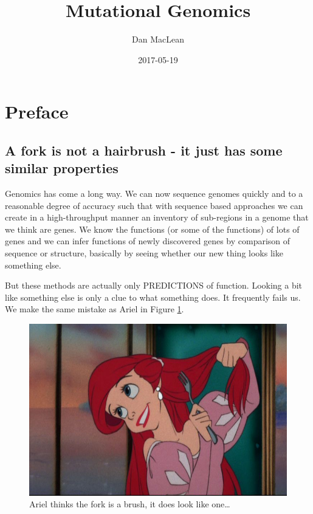 \documentclass[12pt,]{book}
\title{Mutational Genomics}
\author{Dan MacLean}
\date{2017-05-19}
\begin{document}
\maketitle

{
\setcounter{tocdepth}{1}
\tableofcontents
}
\listoffigures
\chapter*{Preface}\label{preface}

\section*{A fork is not a hairbrush - it just has some similar
properties}\label{a-fork-is-not-a-hairbrush---it-just-has-some-similar-properties}

Genomics has come a long way. We can now sequence genomes quickly and to
a reasonable degree of accuracy such that with sequence based approaches
we can create in a high-throughput manner an inventory of sub-regions in
a genome that we think are genes. We know the functions (or some of the
functions) of lots of genes and we can infer functions of newly
discovered genes by comparison of sequence or structure, basically by
seeing whether our new thing looks like something else.

But these methods are actually only PREDICTIONS of function. Looking a
bit like something else is only a clue to what something does. It
frequently fails us. We make the same mistake as Ariel in Figure
\ref{fig:ariel}.




\begin{figure}
\includegraphics[width=4.8in]{assets/ariel} \caption{Ariel thinks the fork is a brush, it does look like
one\ldots{}}\label{fig:ariel}
\end{figure}
\end{document}

